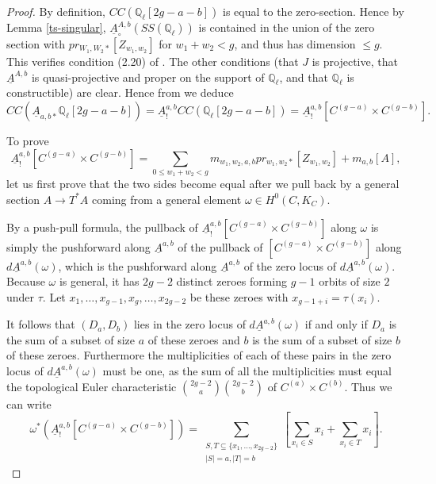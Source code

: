 \documentclass[12pt]{amsart}
\theoremstyle{definition}
\theoremstyle{remark}
\begin{document}
\begin{proof} By definition, $CC ( \mathbb Q_\ell [ 2g-a-b] )$ is equal to the zero-section. Hence by Lemma \ref{ts-singular},  $\underline{A}^{A,b}_{\circ} ( SS (\mathbb Q_\ell) ) $ is contained in the union of the zero section with $pr_{W_1,W_2 *} [ Z_{w_1,w_2} ]$ for $w_1+w_2<g$, and thus has dimension $\leq g$.  This verifies condition (2.20) of \cite[Theorem 2.2.5]{saito-direct}. The other conditions (that $J$ is projective, that $\underline{A}^{A,b}$ is quasi-projective and proper on the support of $\mathbb Q_\ell$, and that $\mathbb Q_\ell$ is constructible) are clear. Hence from \cite[Theorem 2.2.5]{saito-direct} we deduce \[CC  ( \underline{A}_{a,b *} \mathbb Q_\ell[2g-a-b] )= \underline{A}^{a,b}_! CC( \mathbb Q_\ell[2g-a-b]) = \underline{A}^{a,b}_! [ C^{(g-a)} \times C^{(g-b) }]. \]

To prove \[  \underline{A}^{a,b}_! [ C^{(g-a)} \times C^{(g-b) }] = \sum_{0 \leq w_1+ w_2 < g} m_{w_1,w_2,a,b}  pr_{w_1,w_2 *} [ Z_{w_1,w_2} ]  + m_{a,b} [ A]  ,\] let us first prove that the two sides become equal after we pull back by a general section $A \to T^* A$ coming from a general element $\omega  \in H^0(C, K_C)$. 

By a push-pull formula, the pullback of $\underline{A}^{a,b}_! [ C^{(g-a)} \times C^{(g-b) }]$ along $\omega$ is simply the pushforward along $\underline{A}^{a,b}$ of the pullback of $[ C^{(g-a)} \times C^{(g-b) }]$ along $d \underline{A}^{a,b} (\omega)$, which is the pushforward along $\underline{A}^{a,b}$ of the zero locus of $d \underline{A}^{a,b} (\omega)$. Because $\omega$ is general, it has $2g-2$ distinct zeroes forming $g-1$ orbits of size $2$ under $\tau$. Let $x_1,\dots, x_{g-1}, x_g,\dots, x_{2g-2}$ be these zeroes with $x_{g-1+i} = \tau(x_i)$. 

It follows that $(D_a, D_b)$ lies in the zero locus of $d \underline{A}^{a,b} (\omega)$ if and only if $D_a$ is the sum of a subset of size $a$ of these zeroes and $b$ is the sum of a subset of size $b$ of these zeroes. Furthermore the multiplicities of each of these pairs in the zero locus of  $d \underline{A}^{a,b} (\omega)$ must be one, as the sum of all the multiplicities must equal the topological Euler characteristic $\binom{2g-2 }{ a} \binom{2g-2 }{ b}$ of $C^{(a)} \times C^{(b)}$. Thus we can write \[ \omega^* ( \underline{A}^{a,b}_! [ C^{(g-a)} \times C^{(g-b) } ] ) = \sum_{ \substack{ S ,T \subseteq \{x_1,\dots, x_{2g-2}\} \\ |S| = a, |T|= b}} \left[ \sum_{x_i \in S} x_i + \sum_{x_i \in T} x_i \right] .\]


\end{proof}
\end{document}
